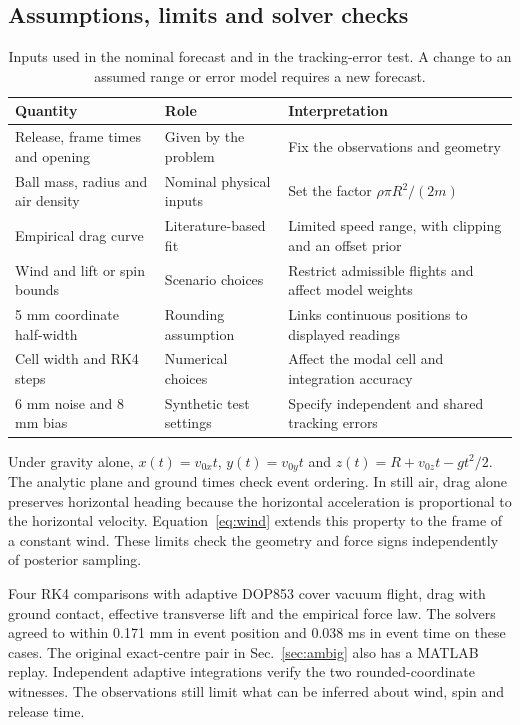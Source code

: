 \subsection{Assumptions, limits and solver checks}
\begin{table}[htbp]\centering\small
\caption{Inputs used in the nominal forecast and in the tracking-error test. A change to an assumed range or error model requires a new forecast.}
\label{tab:assumptions}
\begin{tabular}{@{}p{.31\linewidth}p{.24\linewidth}p{.36\linewidth}@{}}\toprule
Quantity & Role & Interpretation\\\midrule
Release, frame times and opening & Given by the problem & Fix the observations and geometry\\
Ball mass, radius and air density & Nominal physical inputs & Set the factor \(\rho\pi R^2/(2m)\)\\
Empirical drag curve & Literature-based fit & Limited speed range, with clipping and an offset prior\\
Wind and lift or spin bounds & Scenario choices & Restrict admissible flights and affect model weights\\
5 mm coordinate half-width & Rounding assumption & Links continuous positions to displayed readings\\
Cell width and RK4 steps & Numerical choices & Affect the modal cell and integration accuracy\\
6 mm noise and 8 mm bias & Synthetic test settings & Specify independent and shared tracking errors\\
\bottomrule\end{tabular}
\end{table}

Under gravity alone, \(x(t)=v_{0x}t\), \(y(t)=v_{0y}t\) and \(z(t)=R+v_{0z}t-gt^2/2\). The analytic plane and ground times check event ordering. In still air, drag alone preserves horizontal heading because the horizontal acceleration is proportional to the horizontal velocity. Equation~\eqref{eq:wind} extends this property to the frame of a constant wind. These limits check the geometry and force signs independently of posterior sampling.

Four RK4 comparisons with adaptive DOP853 cover vacuum flight, drag with ground contact, effective transverse lift and the empirical force law. The solvers agreed to within 0.171 mm in event position and 0.038 ms in event time on these cases. The original exact-centre pair in Sec.~\ref{sec:ambig} also has a MATLAB replay. Independent adaptive integrations verify the two rounded-coordinate witnesses. The observations still limit what can be inferred about wind, spin and release time.
